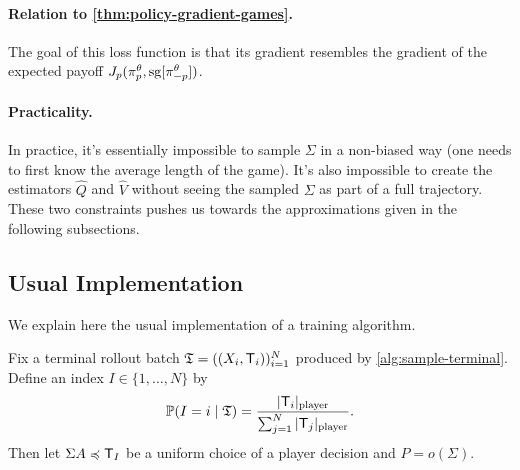 \documentclass[12pt, a4paper]{article}
\begin{document}
\paragraph{Relation to \autoref{thm:policy-gradient-games}.}
The goal of this loss function is that its gradient resembles the gradient of the expected payoff $J_p(\pi^\theta_p, \operatorname{sg}[\pi^\theta_{-p}])$.

\paragraph{Practicality.}
In practice, it's essentially impossible to sample $\Sigma$ in a non-biased way (one needs to first know the average length of the game).
It's also impossible to create the estimators $\widehat{Q}$ and $\widehat{V}$ without seeing the sampled $\Sigma$ as part of a full trajectory.
These two constraints pushes us towards the approximations given in the following subsections.

\subsection{Usual Implementation}\label{subsec:pg-usual-implementation}

We explain here the usual implementation of a training algorithm.

\begin{algorithm}[H]
\caption{$\mathfrak{T}\gets$~\texttt{SampleTerminal}$(\pi,N)$}
\label{alg:sample-terminal}
\DontPrintSemicolon
{}
\end{algorithm}

\begin{definition}\label{def:terminal-rollout-decision-law}
Fix a terminal rollout batch $\mathfrak{T}=((X_i,\mathsf{T}_i))_{i=1}^N$ produced by \cref{alg:sample-terminal}.
Define an index $I\in\{1,\ldots,N\}$ by
\begin{equation}\label{eq:terminal-rollout-index-law}
  \mathbb{P}(I=i\mid\mathfrak{T})
  =
  \frac{|\mathsf{T}_i|_{\textnormal{player}}}
       {\sum_{j=1}^N|\mathsf{T}_j|_{\textnormal{player}}}.
\end{equation}
Then let $\Sigma A \preccurlyeq \mathsf{T}_I$ be a uniform choice of a player decision and $P = o(\Sigma)$.
\end{definition}
\end{document}
